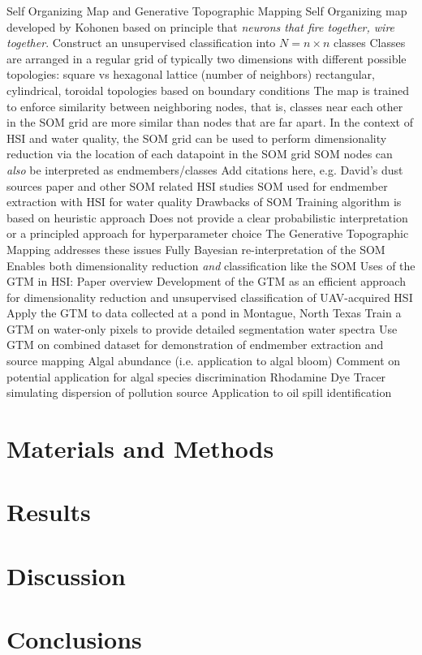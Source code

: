 \documentclass{article}
\begin{document}
\begin{outline}[enumerate]
\1 Self Organizing Map and Generative Topographic Mapping
    \2 Self Organizing map developed by Kohonen based on principle that \textit{neurons that fire together, wire together}.
        \3 Construct an unsupervised classification into $N=n\times n$ classes
        \3 Classes are arranged in a regular grid of typically two dimensions with different possible topologies:
            \4 square vs hexagonal lattice (number of neighbors)
            \4 rectangular, cylindrical, toroidal topologies based on boundary conditions
        \3 The map is trained to enforce similarity between neighboring nodes, that is, classes near each other in the SOM grid are more similar than nodes that are far apart. 
        \3 In the context of HSI and water quality, the SOM grid can be used to perform dimensionality reduction via the location of each datapoint in the SOM grid 
        \3 SOM nodes can \textit{also} be interpreted as endmembers/classes
            \4 Add citations here, e.g. David's dust sources paper and other SOM related HSI studies
            \4 SOM used for endmember extraction with HSI for water quality \cite{cantero2004analysis}
    \2 Drawbacks of SOM
        \3 Training algorithm is based on heuristic approach
        \3 Does not provide a clear probabilistic interpretation or a principled approach for hyperparameter choice
    \2 The Generative Topographic Mapping addresses these issues
        \3 Fully Bayesian re-interpretation of the SOM
        \3 Enables both dimensionality reduction \textit{and} classification like the SOM
        \3 Uses of the GTM in HSI:
\1 Paper overview
    \2 Development of the GTM as an efficient approach for dimensionality reduction and unsupervised classification of UAV-acquired HSI
    \2 Apply the GTM to data collected at a pond in Montague, North Texas
    \2 Train a GTM on water-only pixels to provide detailed segmentation water spectra
    \2 Use GTM on combined dataset for demonstration of endmember extraction and source mapping
        \3 Algal abundance (i.e. application to algal bloom)
            \4 Comment on potential application for algal species discrimination
        \3 Rhodamine Dye Tracer simulating dispersion of pollution source
            \4 Application to oil spill identification
        
\end{outline}
    
\section*{Materials and Methods}
\section*{Results}
\section*{Discussion}
\section*{Conclusions}



\end{document}
